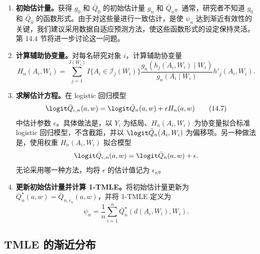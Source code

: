 \begin{enumerate}
 \item \textbf{初始估计量。}获得 $g_0$ 和 $\bar Q_0$ 的初始估计量 $g_n$ 和 $\bar Q_n$。通常，研究者不知道 $g_0$ 和 $\bar Q_0$ 的函数形式。由于对这些量进行一致估计，是使 $\psi_n$ 达到渐近有效性的关键，我们建议采用数据自适应预测方法，使这些函数形式的设定保持灵活。第 14.4 节将进一步讨论这一问题。

 \item \textbf{计算辅助协变量。}对每名研究对象 $i$，计算辅助协变量
 \[
 H_n(A_i,W_i)=\sum_{j=1}^{J(W_i)}I\{A_i\in\mathcal I_j(W_i)\}
 \frac{g_n(h_j(A_i,W_i)\mid W_i)}{g_n(A_i\mid W_i)}h'_j(A_i,W_i).
 \]

 \item \textbf{求解估计方程。}在 logistic 回归模型
 \begin{equation}
  \logit\bar Q_{\epsilon,n}(a,w)=\logit\bar Q_n(a,w)+\epsilon H_n(a,w)
  \tag{14.7}
 \end{equation}
 中估计参数 $\epsilon$。具体做法是，以 $Y_i$ 为结局、$H_n(A_i,W_i)$ 为协变量拟合标准 logistic 回归模型，不含截距，并以 $\logit\bar Q_n(A_i,W_i)$ 为偏移项。另一种做法是，使用权重 $H_n(A_i,W_i)$ 拟合模型
 \[
  \logit\bar Q_{\epsilon,n}(a,w)=\logit\bar Q_n(a,w)+\epsilon.
 \]
 无论采用哪一种方法，均将 $\epsilon$ 的估计值记为 $\epsilon_n$。

 \item \textbf{更新初始估计量并计算 1-TMLE。}将初始估计量更新为
 $\bar Q_n^\star(a,w)=\bar Q_{n,\epsilon_n}(a,w)$，并将 \mbox{1-TMLE} 定义为
 \[
  \psi_n=\frac1n\sum_{i=1}^n\bar Q_n^\star(d(A_i,W_i),W_i).
 \]
\end{enumerate}

\subsection{TMLE 的渐近分布}

